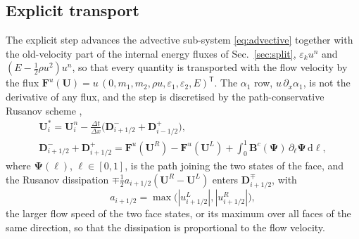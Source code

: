 \subsection{Explicit transport}
\label{sec:advective}
The explicit step advances the advective sub-system \eqref{eq:advective} together with the old-velocity part of the internal
energy fluxes of Sec.~\ref{sec:split}, $\varepsilon_ku^n$ and $(E-\tfrac12\rho u^2)u^n$, so that every quantity is transported with the flow velocity
by the flux $\mathbf F^u(\mathbf U)=u\,(0,m_1,m_2,\rho u,\varepsilon_1,\varepsilon_2,E)^{\mathsf T}$. The $\alpha_1$ row, $u\,\partial_x\alpha_1$, is not the derivative of
any flux, and the step is discretised by the path-conservative Rusanov scheme
\cite{DalMaso1995,Pares2006,Castro2006},
\begin{equation}
\begin{gathered}
\mathbf U^*_i=\mathbf U^n_i-\frac{\Delta t}{\Delta x}\Big(\mathbf D^-_{i+1/2}+\mathbf D^+_{i-1/2}\Big),\\
\mathbf D^-_{i+1/2}+\mathbf D^+_{i+1/2}=\mathbf F^u(\mathbf U^R)-\mathbf F^u(\mathbf U^L)+\int_0^1\mathbf B^c(\boldsymbol\Psi)\,\partial_\ell\boldsymbol\Psi\,\mathrm d\ell ,
\end{gathered}
\label{eq:pc_update}
\end{equation}
where $\boldsymbol\Psi(\ell)$, $\ell\in[0,1]$, is the path joining the two states of the face, and the Rusanov dissipation
$\mp\tfrac12a_{i+1/2}(\mathbf U^R-\mathbf U^L)$ enters $\mathbf D^\mp_{i+1/2}$, with
\begin{equation}
a_{i+1/2}=\max\big(|u^L_{i+1/2}|,|u^R_{i+1/2}|\big),
\label{eq:rusanov_speed}
\end{equation}
the larger flow speed of the two face states, or its maximum over all faces of the same
direction, so that the dissipation is proportional to the flow velocity.

